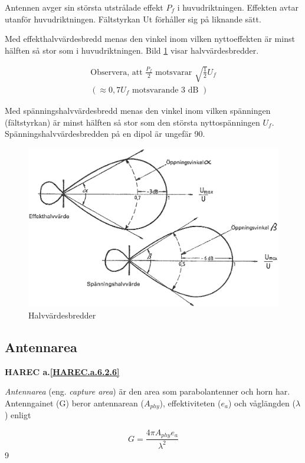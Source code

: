 Antennen avger sin största utstrålade effekt \(P_f\) i huvudriktningen.
Effekten avtar utanför huvudriktningen.
Fältstyrkan Ut förhåller sig på liknande sätt.

Med effekthalvvärdesbredd menas den vinkel inom vilken nyttoeffekten
är minst hälften så stor som i huvudriktningen.
Bild \ref{fig:bildII6-10} visar halvvärdesbredder.

\begin{gather*}
  \text{Observera, att } \frac{P_f}{2} \text{ motsvarar }
  \sqrt{\frac{1}{2}}U_f \\
  ( \approx 0,7 U_f \text{ motsvarande 3 dB })
\end{gather*}

Med spänningshalvvärdesbredd menas den vinkel inom vilken spänningen
(fältstyrkan) är minst hälften så stor som den största nyttospänningen \(U_f\).
Spänningshalvvärdesbredden på en dipol är ungefär 90\degree.

\begin{figure}
  \includegraphics[width=\textwidth]{images/cropped_pdfs/bild_2_6-10.pdf}
  \caption{Halvvärdesbredder}
  \label{fig:bildII6-10}
\end{figure}

\subsection{Antennarea}
\textbf{
HAREC a.\ref{HAREC.a.6.2.6}\label{myHAREC.a.6.2.6}
}

\emph{Antennarea} (eng. \emph{capture area}) är den area som parabolantenner
och horn har.
Antenngainet (G) beror antennarean (\(A_{phy}\)), effektiviteten (\(e_a\)) och
våglängden (\(\lambda\)) enligt

\[ G = \frac{4\pi A_{phy}e_a}{\lambda^2} \]
9
